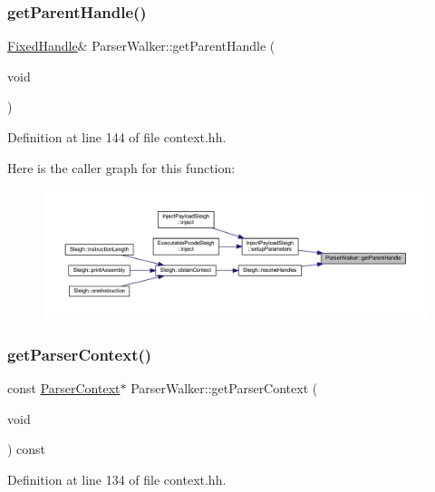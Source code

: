 \subsubsection{\texorpdfstring{getParentHandle()}{getParentHandle()}}
{\footnotesize\ttfamily \mbox{\hyperlink{struct_fixed_handle}{Fixed\+Handle}}\& Parser\+Walker\+::get\+Parent\+Handle (\begin{DoxyParamCaption}\item[{void}]{ }\end{DoxyParamCaption})\hspace{0.3cm}{\ttfamily [inline]}}



Definition at line 144 of file context.\+hh.

Here is the caller graph for this function\+:
\nopagebreak
\begin{figure}[H]
\begin{center}
\leavevmode
\includegraphics[width=350pt]{class_parser_walker_a29772169263a35683724c03d90372734_icgraph}
\end{center}
\end{figure}
\mbox{\label{class_parser_walker_a3468c4fffb0a6ab229883ac9769e46f2}} 
\subsubsection{\texorpdfstring{getParserContext()}{getParserContext()}}
{\footnotesize\ttfamily const \mbox{\hyperlink{class_parser_context}{Parser\+Context}}$\ast$ Parser\+Walker\+::get\+Parser\+Context (\begin{DoxyParamCaption}\item[{void}]{ }\end{DoxyParamCaption}) const\hspace{0.3cm}{\ttfamily [inline]}}



Definition at line 134 of file context.\+hh.

